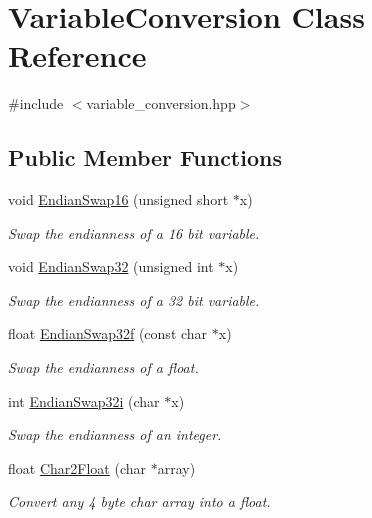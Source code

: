 \hypertarget{class_variable_conversion}{}\section{Variable\+Conversion Class Reference}
\label{class_variable_conversion}


{\ttfamily \#include $<$variable\+\_\+conversion.\+hpp$>$}

\subsection*{Public Member Functions}
\begin{DoxyCompactItemize}
\item 
void \mbox{\hyperlink{class_variable_conversion_a4ecffbff30f29f7d466b884b490a0c21}{Endian\+Swap16}} (unsigned short $\ast$x)
\begin{DoxyCompactList}\small\item\em Swap the endianness of a 16 bit variable. \end{DoxyCompactList}\item 
void \mbox{\hyperlink{class_variable_conversion_a7ee01caff268378f05f985aea3c3d632}{Endian\+Swap32}} (unsigned int $\ast$x)
\begin{DoxyCompactList}\small\item\em Swap the endianness of a 32 bit variable. \end{DoxyCompactList}\item 
float \mbox{\hyperlink{class_variable_conversion_a148552cb5b64d68c2ab2a70727ebcafb}{Endian\+Swap32f}} (const char $\ast$x)
\begin{DoxyCompactList}\small\item\em Swap the endianness of a float. \end{DoxyCompactList}\item 
int \mbox{\hyperlink{class_variable_conversion_ae10304a5223aa1913aac928e5ecce8f9}{Endian\+Swap32i}} (char $\ast$x)
\begin{DoxyCompactList}\small\item\em Swap the endianness of an integer. \end{DoxyCompactList}\item 
float \mbox{\hyperlink{class_variable_conversion_ad306788e148ee803542922852f91026f}{Char2\+Float}} (char $\ast$array)
\begin{DoxyCompactList}\small\item\em Convert any 4 byte char array into a float. \end{DoxyCompactList}\item 

\end{DoxyCompactItemize}
